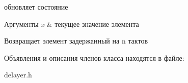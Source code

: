 обновляет состояние 


\begin{DoxyParams}{Аргументы}
{\em x} & текущее значение элемента \\
\hline
\end{DoxyParams}
\begin{DoxyReturn}{Возвращает}
элемент задержанный на n тактов 
\end{DoxyReturn}


Объявления и описания членов класса находятся в файле\+:\begin{DoxyCompactItemize}
\item 
delayer.\+h\end{DoxyCompactItemize}
